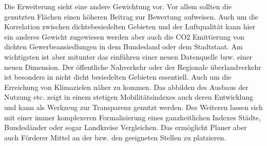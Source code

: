 Die Erweiterung sieht eine andere Gewichtung vor. Vor allem sollten die genutzten Flächen einen höheren Beitrag zur Bewertung aufweisen. Auch um die Korrelation zwischen dichtebesiedelten Gebieten und der Luftqualität kann hier ein anderes Gewicht zugewiesen werden aber auch die CO2 Emittierung von dichten Gewerbeansiedlungen in dem Bundesland oder dem Stadtstaat.
Am wichtigsten ist aber mitunter das einführen einer neuen Datenquelle bzw. einer neuen Dimension. Der öffentliche Nahverkehr oder der Regionale überlandverkehr ist besonders in nicht dicht besiedelten Gebieten essentiell.
Auch um die Erreichung von Klimazielen näher zu kommen. Das abbilden des Ausbaus der Nutzung etc. zeigt in einem stetigen Mobilitätsindexes auch deren Entwicklung und kann als Werkzeug zur Transparenz genutzt werden.
Des Weiteren lassen sich mit einer immer komplexeren Formalisierung eines ganzheitlichen Indexes Städte, Bundesländer oder sogar Landkreise Vergleichen. Das ermöglicht Planer aber auch Förderer Mittel an der bzw. den geeigneten Stellen zu platzieren.






